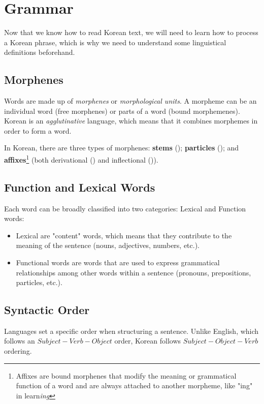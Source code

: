 \section{Grammar}

Now that we know how to read Korean text, we will need to learn how to process a Korean phrase, which is why we need to understand some linguistical definitions beforehand.

\subsection{Morphenes}

Words are made up of \textit{morphenes} or \textit{morphological units}. A morpheme can be an individual word (free morphenes) or parts of a word (bound morphemenes). Korean is an \textit{agglutinative} language, which means that it combines morphemes in order to form a word.

In Korean, there are three types of morphenes: \textbf{stems} (); \textbf{particles} (); and \textbf{affixes}\footnote{Affixes are bound morphenes that modify the meaning or grammatical function of a word and are always attached to another morpheme, like "ing" in learn\textit{ing}} (both derivational () and inflectional ()).

\subsection{Function and Lexical Words}

Each word can be broadly classified into two categories: Lexical and Function words:
\begin{itemize}
    \item Lexical are "content" words, which means that they contribute to the meaning of the sentence (nouns, adjectives, numbers, etc.). 
    
    \item Functional words are words that are used to express grammatical relationships among other words within a sentence (pronouns, prepositions, particles, etc.).
\end{itemize}

\subsection{Syntactic Order}

Languages set a specific order when structuring a sentence. Unlike English, which follows an $Subject-Verb-Object$ order, Korean follows $Subject-Object-Verb$ ordering.
